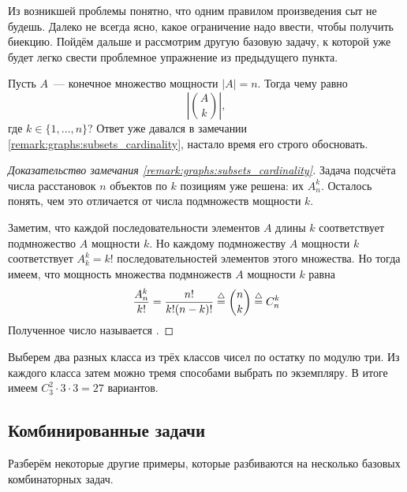 Из возникшей проблемы понятно, что одним правилом произведения сыт не будешь.
Далеко не всегда ясно, какое ограничение надо ввести, чтобы получить биекцию.
Пойдём дальше и рассмотрим другую базовую задачу, к которой уже будет легко свести проблемное упражнение из предыдущего пункта.

Пусть $ A $~--- конечное множество мощности $ |A| = n $.
Тогда чему равно
\[
    \left| \binom{A}{k} \right|,
\]
где $ k \in \{1, \ldots, n\} $?
Ответ уже давался в замечании \ref{remark:graphs:subsets_cardinality}, настало время его строго обосновать.

\begin{proof}[Доказательство замечания \ref{remark:graphs:subsets_cardinality}]
    Задача подсчёта числа расстановок $ n $ объектов по $ k $ позициям уже решена:
    их $ A_n^k $.
    Осталось понять, чем это отличается от числа подмножеств мощности $ k $.

    Заметим, что каждой последовательности элементов $ A $ длины $ k $ соответствует подмножество $ A $ мощности $ k $.
    Но каждому подмножеству $ A $ мощности $ k $ соответствует $ A_k^k = k! $ последовательностей элементов этого множества.
    Но тогда имеем, что мощность множества подмножеств $ A $ мощности $ k $ равна
    \begin{equation}
        \label{eq:combinatorics:binomial}
        \frac{A_n^k}{k!} = \frac{n!}{k!(n-k)!} \overset{\triangle}{=} \binom{n}{k} \overset{\triangle}{=} C_n^k
    \end{equation}
    Полученное число называется .
\end{proof}

\vspace{\baselineskip}

\begin{Answer}
    \noindent
    Выберем два разных класса из трёх классов чисел по остатку по модулю три.
    Из каждого класса затем можно тремя способами выбрать по экземпляру.
    В итоге имеем $ C_3^2 \cdot 3 \cdot 3 = 27 $ вариантов.
\end{Answer}



\subsection{Комбинированные задачи}
\label{subsec:combinatorics:combined}

Разберём некоторые другие примеры, которые разбиваются на несколько базовых комбинаторных задач.

